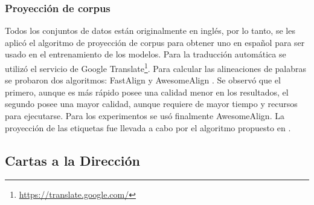 \documentclass[a4paper,11pt,twocolumn,twoside]{article}
\begin{document}
\begin{table}[h]
	\begin{center}
	\end{center}
	\caption{Datos promedios comparando los textos originales con los aumentados.}\label{table:data_augmentation}
\end{table}

\subsubsection{Proyección de corpus}

Todos los conjuntos de datos están originalmente en inglés, por lo tanto, se les aplicó el algoritmo de proyección
de corpus para obtener uno en español para ser usado en el entrenamiento de los modelos. 
Para la traducción automática se utilizó el servicio de Google Translate\footnote{\url{https://translate.google.com/}}. 
Para calcular las 
alineaciones de palabras se probaron dos algoritmos: FastAlign \cite{dyer2013fastalign} y AwesomeAlign 
\cite{dou2021word}. Se observó que el primero, aunque es más rápido posee una calidad menor en los resultados,
el segundo posee una mayor calidad, aunque requiere de mayor tiempo y recursos para ejecutarse. Para los experimentos
se usó finalmente AwesomeAlign. La proyección de las etiquetas fue llevada a cabo por el algoritmo propuesto 
en \cite{eger2018cross}.

\subsection{Cartas a la Dirección}
\end{document}
